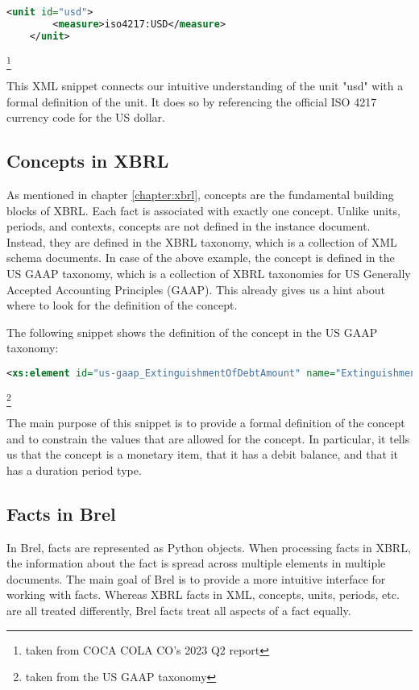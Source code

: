\begin{lstlisting}[language=XML]
    <unit id="usd">
        <measure>iso4217:USD</measure>
    </unit>
\end{lstlisting}\footnote[3]{taken from COCA COLA CO's 2023 Q2 report}

This XML snippet connects our intuitive understanding of the unit "usd" with a formal definition of the unit.
It does so by referencing the official ISO 4217 currency code for the US dollar.

\subsection{Concepts in XBRL}

As mentioned in chapter \ref*{chapter:xbrl}, concepts are the fundamental building blocks of XBRL.
Each fact is associated with exactly one concept.
Unlike units, periods, and contexts, concepts are not defined in the instance document.
Instead, they are defined in the XBRL taxonomy, which is a collection of XML schema documents.
In case of the above example, the concept is defined in the US GAAP taxonomy, which is a collection of XBRL taxonomies for US Generally Accepted Accounting Principles (GAAP).
This already gives us a hint about where to look for the definition of the concept.

The following snippet shows the definition of the concept in the US GAAP taxonomy:

\begin{lstlisting}[language=XML]
    <xs:element id="us-gaap_ExtinguishmentOfDebtAmount" name="ExtinguishmentOfDebtAmount" nillable="true" substitutionGroup="xbrli:item" type="xbrli:monetaryItemType" xbrli:balance="debit" xbrli:periodType="duration"/>
\end{lstlisting}\footnote[4]{taken from the US GAAP taxonomy}

The main purpose of this snippet is to provide a formal definition of the concept and to constrain the values that are allowed for the concept.
In particular, it tells us that the concept is a monetary item, that it has a debit balance, and that it has a duration period type.

\subsection{Facts in Brel}

In Brel, facts are represented as Python objects. 
When processing facts in XBRL, the information about the fact is spread across multiple elements in multiple documents.
The main goal of Brel is to provide a more intuitive interface for working with facts.
Whereas XBRL facts in XML, concepts, units, periods, etc. are all treated differently, Brel facts treat all aspects of a fact equally.